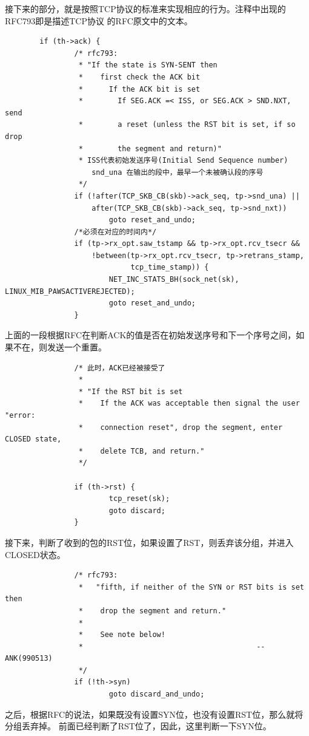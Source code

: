         接下来的部分，就是按照TCP协议的标准来实现相应的行为。注释中出现的RFC793即是描述TCP协议
        的RFC原文中的文本。
\begin{verbatim}
        if (th->ack) {
                /* rfc793:
                 * "If the state is SYN-SENT then
                 *    first check the ACK bit
                 *      If the ACK bit is set
                 *        If SEG.ACK =< ISS, or SEG.ACK > SND.NXT, send
                 *        a reset (unless the RST bit is set, if so drop
                 *        the segment and return)"
                 * ISS代表初始发送序号(Initial Send Sequence number)
                    snd_una 在输出的段中，最早一个未被确认段的序号
                 */
                if (!after(TCP_SKB_CB(skb)->ack_seq, tp->snd_una) ||
                    after(TCP_SKB_CB(skb)->ack_seq, tp->snd_nxt))
                        goto reset_and_undo;
                /*必须在对应的时间内*/
                if (tp->rx_opt.saw_tstamp && tp->rx_opt.rcv_tsecr &&
                    !between(tp->rx_opt.rcv_tsecr, tp->retrans_stamp,
                             tcp_time_stamp)) {
                        NET_INC_STATS_BH(sock_net(sk), LINUX_MIB_PAWSACTIVEREJECTED);
                        goto reset_and_undo;
                }
\end{verbatim}
上面的一段根据RFC在判断ACK的值是否在初始发送序号和下一个序号之间，如果不在，则发送一个重置。
\begin{verbatim}
                /* 此时，ACK已经被接受了
                 *
                 * "If the RST bit is set
                 *    If the ACK was acceptable then signal the user "error:
                 *    connection reset", drop the segment, enter CLOSED state,
                 *    delete TCB, and return."
                 */

                if (th->rst) {
                        tcp_reset(sk);
                        goto discard;
                }
\end{verbatim}
接下来，判断了收到的包的RST位，如果设置了RST，则丢弃该分组，并进入CLOSED状态。
\begin{verbatim}
                /* rfc793:
                 *   "fifth, if neither of the SYN or RST bits is set then
                 *    drop the segment and return."
                 *
                 *    See note below!
                 *                                        --ANK(990513)
                 */
                if (!th->syn)
                        goto discard_and_undo;
\end{verbatim}
之后，根据RFC的说法，如果既没有设置SYN位，也没有设置RST位，那么就将分组丢弃掉。
前面已经判断了RST位了，因此，这里判断一下SYN位。

